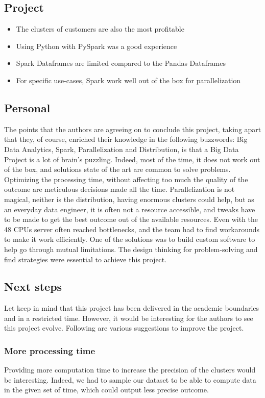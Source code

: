 \documentclass[a4paper]{article}
\begin{document}
\subsection{Project}
\begin{itemize}
    \item The clusters of customers are also the most profitable
    \item Using Python with PySpark was a good experience
    \item Spark Dataframes are limited compared to the Pandas Dataframes
    \item For specific use-cases, Spark work well out of the box for parallelization
\end{itemize}

\subsection{Personal}
The points that the authors are agreeing on to conclude this project, taking apart that they, of course, enriched their knowledge in the following buzzwords: Big Data Analytics, Spark, Parallelization and Distribution, is that a Big Data Project is a lot of brain's puzzling. Indeed, most of the time, it does not work out of the box, and solutions state of the art are common to solve problems. Optimizing the processing time, without affecting too much the quality of the outcome are meticulous decisions made all the time. Parallelization is not magical, neither is the distribution, having enormous clusters could help, but as an everyday data engineer, it is often not a resource accessible, and tweaks have to be made to get the best outcome out of the available resources. Even with the 48 CPUs server often reached bottlenecks, and the team had to find workarounds to make it work efficiently. One of the solutions was to build custom software to help go through mutual limitations. The design thinking for problem-solving and find strategies were essential to achieve this project.


\subsection{Next steps}
Let keep in mind that this project has been delivered in the academic boundaries and in a restricted time. However, it would be interesting for the authors to see this project evolve. Following are various suggestions to improve the project.

\subsubsection{More processing time}
Providing more computation time to increase the precision of the clusters would be interesting. Indeed, we had to sample our dataset to be able to compute data in the given set of time, which could output less precise outcome.
\end{document}
